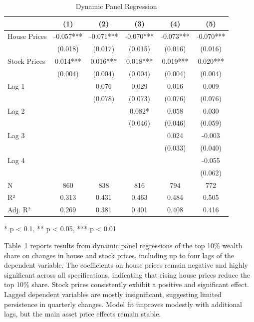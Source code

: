 \documentclass[
  a4paper,
  DIV=11,
  numbers=noendperiod]{scrartcl}
\begin{document}
\begin{table}[h]

\caption{\label{tbl-dynamic}Dynamic Panel Regression}

\begin{minipage}{\linewidth}

\fontsize{9.0pt}{10.8pt}\selectfont
\begin{tabular*}{\linewidth}{@{\extracolsep{\fill}}lccccc}
\toprule
  & (1) & (2) & (3) & (4) & (5) \\ 
\midrule\addlinespace[2.5pt]
House Prices & -0.057*** & -0.071*** & -0.070*** & -0.073*** & -0.070*** \\ 
 & (0.018) & (0.017) & (0.015) & (0.016) & (0.016) \\ 
Stock Prices & 0.014*** & 0.016*** & 0.018*** & 0.019*** & 0.020*** \\ 
 & (0.004) & (0.004) & (0.004) & (0.004) & (0.004) \\ 
Lag 1 &  & 0.076 & 0.029 & 0.016 & 0.009 \\ 
 &  & (0.078) & (0.073) & (0.076) & (0.076) \\ 
Lag 2 &  &  & 0.082* & 0.058 & 0.030 \\ 
 &  &  & (0.046) & (0.046) & (0.059) \\ 
Lag 3 &  &  &  & 0.024 & -0.003 \\ 
 &  &  &  & (0.033) & (0.040) \\ 
Lag 4 &  &  &  &  & -0.055 \\ 
{} & {} & {} & {} & {} & {(0.062)} \\ 
N & 860 & 838 & 816 & 794 & 772 \\ 
R² & 0.313 & 0.431 & 0.463 & 0.484 & 0.505 \\ 
Adj. R² & 0.269 & 0.381 & 0.401 & 0.408 & 0.416 \\ 
\bottomrule
\end{tabular*}
\begin{minipage}{\linewidth}
* p < 0.1, ** p < 0.05, *** p < 0.01\\
\end{minipage}

\end{minipage}%
\newline
\begin{minipage}{\linewidth}
\end{minipage}%

\end{table}%

Table~\ref{tbl-dynamic} reports results from dynamic panel regressions
of the top 10\% wealth share on changes in house and stock prices,
including up to four lags of the dependent variable. The coefficients on
house prices remain negative and highly significant across all
specifications, indicating that rising house prices reduce the top 10\%
share. Stock prices consistently exhibit a positive and significant
effect. Lagged dependent variables are mostly insignificant, suggesting
limited persistence in quarterly changes. Model fit improves modestly
with additional lags, but the main asset price effects remain stable.
\end{document}
